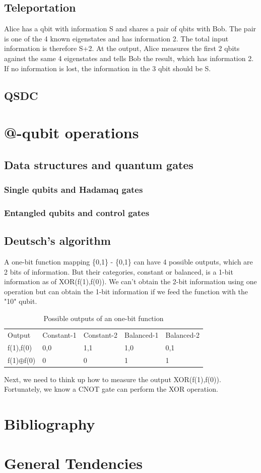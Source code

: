 \documentclass{book}
\begin{document}
\section{Teleportation}
Alice has a qbit with information S and shares a pair of qbits with Bob. The pair is one of the 4 known eigenstates and has information 2. The total input information is therefore S+2. At the output, Alice measures the first 2 qbits against the same 4 eigenstates and tells Bob the result, which has information 2. If no information is lost, the information in the 3 qbit should be S.

\section{QSDC}

\chapter{@-qubit operations}
\section{Data structures and quantum gates}
\subsection{Single qubits and Hadamaq gates}
\subsection{Entangled qubits and control gates}
\section{Deutsch's algorithm}
A one-bit function mapping \{0,1\} -\> \{0,1\} can have 4 possible outputs, which are 2 bits of information. But their categories, constant or balanced, is a 1-bit information as of XOR(f(1),f(0)). We can't obtain the 2-bit information using one operation but can obtain the 1-bit information if we feed the function with the "10" qubit.

\begin{table}[]
\caption{Possible outputs of an one-bit function}
\label{1function}
\begin{tabular}{lllll}
Output & Constant-1 & Constant-2 & Balanced-1 & Balanced-2                 \\
f(1),f(0)      & 0,0   & 1,1 & 1,0 & 0,1               \\
f(1)$\oplus$f(0)   & 0   & 0  & 1 & 1
\end{tabular}
\end{table}

Next, we need to think up how to measure the output XOR(f(1),f(0)). Fortunately, we know a CNOT gate can perform the XOR operation.

\chapter{Bibliography}

   
 
\chapter{General Tendencies}

\backmatter
{}
\printindex
\end{document}
